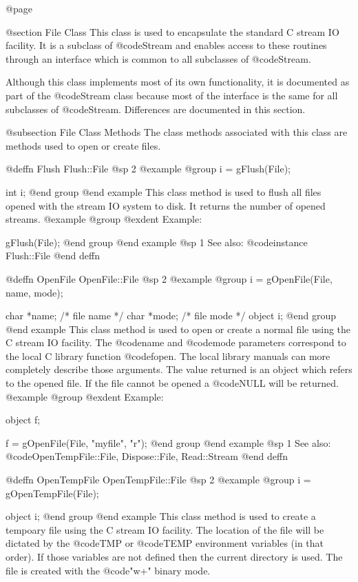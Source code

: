@page

@section File Class
This class is used to encapsulate the standard C stream IO facility.  It
is a subclass of @code{Stream} and enables access to these routines
through an interface which is common to all subclasses of @code{Stream}.

Although this class implements most of its own functionality, it is
documented as part of the @code{Stream} class because most of the
interface is the same for all subclasses of @code{Stream}.  Differences
are documented in this section.


@subsection File Class Methods
The class methods associated with this class are methods used to
open or create files.




@deffn {Flush} Flush::File
@sp 2
@example
@group
i = gFlush(File);

int  i;
@end group
@end example
This class method is used to flush all files opened with the
stream IO system to disk.  It returns the number of opened
streams.
@example
@group
@exdent Example:

gFlush(File);
@end group
@end example
@sp 1
See also:  @code{instance Flush::File}
@end deffn







@deffn {OpenFile} OpenFile::File
@sp 2
@example
@group
i = gOpenFile(File, name, mode);

char    *name;  /*  file name  */
char    *mode;  /*  file mode  */
object  i;
@end group
@end example
This class method is used to open or create a normal file using the
C stream IO facility.  The @code{name} and @code{mode} parameters
correspond to the local C library function @code{fopen}.  The
local library manuals can more completely describe those arguments.
The value returned is an object which refers to the opened file.
If the file cannot be opened a @code{NULL} will be returned.
@example
@group
@exdent Example:

object  f;

f = gOpenFile(File, "myfile", "r");
@end group
@end example
@sp 1
See also:  @code{OpenTempFile::File, Dispose::File, Read::Stream}
@end deffn





@deffn {OpenTempFile} OpenTempFile::File
@sp 2
@example
@group
i = gOpenTempFile(File);

object  i;
@end group
@end example
This class method is used to create a tempoary file using the C stream
IO facility.  The location of the file will be dictated by the
@code{TMP} or @code{TEMP} environment variables (in that order).  If
those variables are not defined then the current directory is used.  The
file is created with the @code{"w+"} binary mode.

